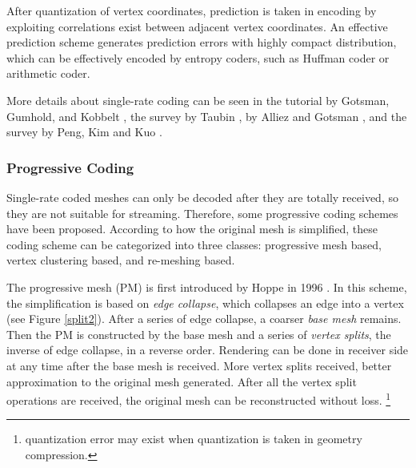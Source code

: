 \documentclass[11pt, a4paper]{report}
\begin{document}
    After quantization of vertex coordinates, prediction is taken in
    encoding by exploiting correlations exist between adjacent vertex
    coordinates. An effective prediction scheme generates prediction
    errors with highly compact distribution, which can be effectively
    encoded by entropy coders, such as Huffman coder or arithmetic
    coder. 

    More details about single-rate coding can be seen in the tutorial
    by Gotsman, Gumhold, and Kobbelt \cite{gotsman-simplification},
    the survey by Taubin \cite{3d:Taubin}, by Alliez and Gotsman
    \cite{recent:alliez}, and the survey by Peng, Kim and Kuo
    \cite{technologies:peng}.
    \subsubsection{Progressive Coding}
    Single-rate coded meshes can only be decoded after they are
    totally received, so they are not suitable for streaming. Therefore,
    some progressive coding schemes have been proposed. According to
    how the original mesh is simplified, these coding scheme can be
    categorized into three classes: progressive mesh based, vertex
    clustering based, and re-meshing based.

    The progressive mesh (PM) \label{progressive_mesh}is first
    introduced by Hoppe in 1996 \cite{hoppe96progressive}. In this
    scheme, the simplification is based on \emph{edge collapse}, which
    collapses an edge into a vertex (see Figure \ref{split2}).
    After a series of edge collapse, a coarser \emph{base mesh} remains. 
    Then the PM is constructed by the base mesh and a series of \emph{vertex
    splits}, the inverse of edge collapse, in a reverse order.
    Rendering can be done in receiver side at any time after the base
    mesh is received. More vertex splits received, better
    approximation to the original mesh generated. After all
    the vertex split operations are received, the original mesh can be
    reconstructed without loss. \footnote{quantization error may exist
    when quantization is taken in geometry compression.}
\end{document}
